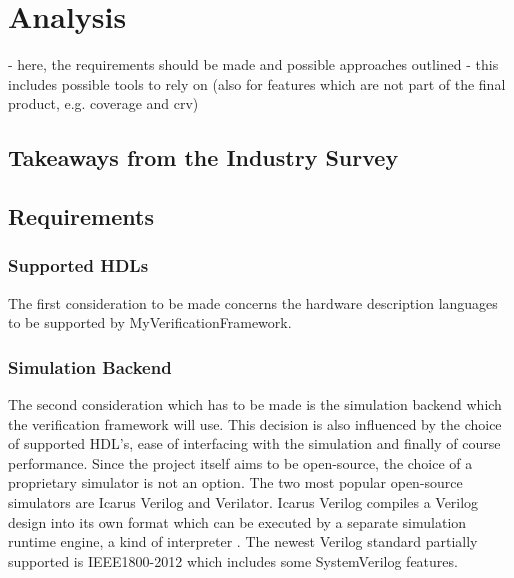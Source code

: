 \documentclass[12pt]{book}
\newcommand{\name}{MyVerificationFramework}
\begin{document}
\begin{comment}
- have own UVM extensions and methodology
- have own scoreboard implementation

- one issue is reset handling in CRV
- own agent for reset handling
- phase hopping is difficult and messy

- see most issues with SV limitations
- parameterized interfaces
- verbose
- boiler plate

- but prefers guidelines over limitations for UVM

- prefers to keep verification code simle and understandable, also for RTL engineers
- does not like overly complex features like event callbacks

\end{comment}

\chapter{Analysis} %

- here, the requirements should be made and possible approaches outlined
- this includes possible tools to rely on (also for features which are not part of the final product, e.g. coverage and crv)

\section{Takeaways from the Industry Survey}

\section{Requirements} %

\subsection{Supported HDLs}
The first consideration to be made concerns the hardware description languages to be supported by \name.

\subsection{Simulation Backend}
The second consideration which has to be made is the simulation backend which the verification framework will use.
This decision is also influenced by the choice of supported HDL's, ease of interfacing with the simulation and
finally of course performance. Since the project itself aims to be open-source, the choice of a proprietary simulator
is not an option. The two most popular open-source simulators are Icarus Verilog and Verilator. Icarus Verilog
compiles a Verilog design into its own format which can be executed by a separate simulation runtime engine, a kind
of interpreter \cite{iverilog}. The newest Verilog standard partially supported is IEEE1800-2012 which includes some
SystemVerilog features.
\end{document}
